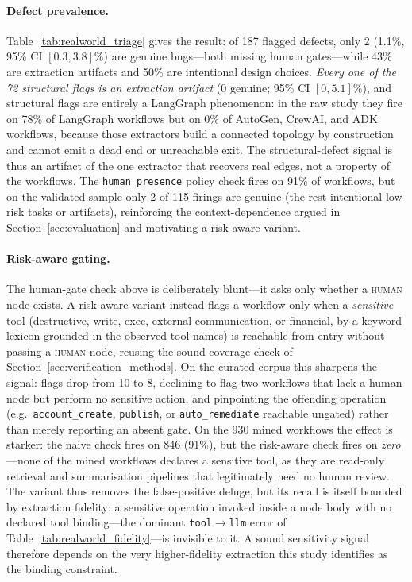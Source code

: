 \paragraph{Defect prevalence.}
Table~\ref{tab:realworld_triage} gives the result: of 187 flagged defects, only
2 (1.1\%, 95\% CI $[0.3,3.8]\%$) are genuine bugs---both missing human
gates---while 43\% are extraction artifacts and 50\% are intentional design
choices. \emph{Every one of the 72 structural flags is an extraction artifact}
(0 genuine; 95\% CI $[0,5.1]\%$), and structural flags are entirely a
LangGraph phenomenon: in the raw study they fire on 78\% of LangGraph workflows
but on 0\% of AutoGen, CrewAI, and ADK workflows, because those extractors build
a connected topology by construction and cannot emit a dead end or unreachable
exit. The structural-defect signal is thus an artifact of the one extractor that
recovers real edges, not a property of the workflows. The \texttt{human\_presence}
policy check fires on 91\% of workflows, but on the validated sample only 2 of
115 firings are genuine (the rest intentional low-risk tasks or artifacts),
reinforcing the context-dependence argued in Section~\ref{sec:evaluation} and
motivating a risk-aware variant.

\paragraph{Risk-aware gating.}
The human-gate check above is deliberately blunt---it asks only whether a
\textsc{human} node exists. A risk-aware variant instead flags a workflow only
when a \emph{sensitive} tool (destructive, write, exec, external-communication,
or financial, by a keyword lexicon grounded in the observed tool names) is
reachable from entry without passing a \textsc{human} node, reusing the sound
coverage check of Section~\ref{sec:verification_methods}. On the curated corpus
this sharpens the signal: flags drop from 10 to 8, declining to flag two
workflows that lack a human node but perform no sensitive action, and pinpointing
the offending operation (e.g.\ \texttt{account\_create}, \texttt{publish}, or
\texttt{auto\_remediate} reachable ungated) rather than merely reporting an absent
gate. On the 930 mined workflows the effect is starker: the naive check fires on
846 (91\%), but the risk-aware check fires on \emph{zero}---none of the mined
workflows declares a sensitive tool, as they are read-only retrieval and
summarisation pipelines that legitimately need no human review. The variant thus
removes the false-positive deluge, but its recall is itself bounded by extraction
fidelity: a sensitive operation invoked inside a node body with no declared tool
binding---the dominant \texttt{tool}$\rightarrow$\texttt{llm} error of
Table~\ref{tab:realworld_fidelity}---is invisible to it. A sound sensitivity
signal therefore depends on the very higher-fidelity extraction this study
identifies as the binding constraint.


